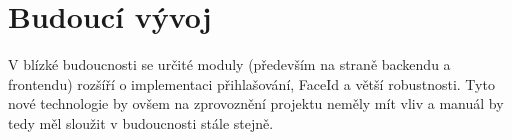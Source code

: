 \documentclass{article}
\begin{document}








\section{Budoucí vývoj}
V blízké budoucnosti se určité moduly (především na straně backendu a frontendu) rozšíří o implementaci přihlašování, FaceId a větší robustnosti. Tyto nové technologie by ovšem na zprovoznění projektu neměly mít vliv a manuál by tedy měl sloužit v budoucnosti stále stejně.
\end{document}
